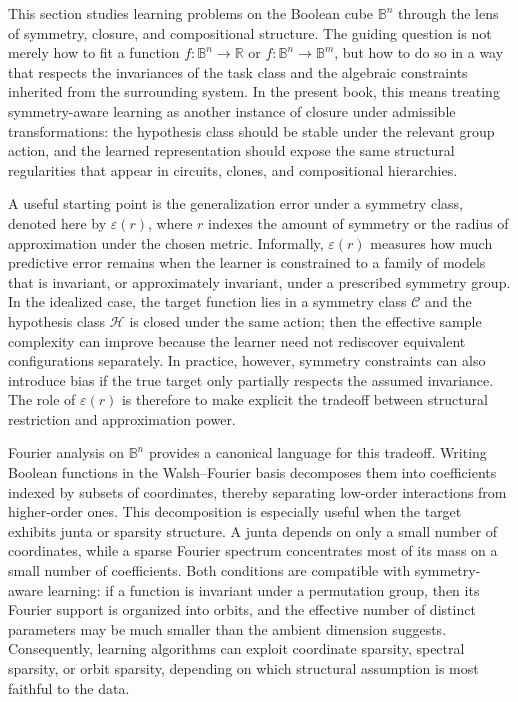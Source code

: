 This section studies learning problems on the Boolean cube \(\mathbb{B}^n\) through the lens of symmetry, closure, and compositional structure. The guiding question is not merely how to fit a function \(f : \mathbb{B}^n \to \mathbb{R}\) or \(f : \mathbb{B}^n \to \mathbb{B}^m\), but how to do so in a way that respects the invariances of the task class and the algebraic constraints inherited from the surrounding system. In the present book, this means treating symmetry-aware learning as another instance of closure under admissible transformations: the hypothesis class should be stable under the relevant group action, and the learned representation should expose the same structural regularities that appear in circuits, clones, and compositional hierarchies.

A useful starting point is the generalization error under a symmetry class, denoted here by \(\varepsilon(r)\), where \(r\) indexes the amount of symmetry or the radius of approximation under the chosen metric. Informally, \(\varepsilon(r)\) measures how much predictive error remains when the learner is constrained to a family of models that is invariant, or approximately invariant, under a prescribed symmetry group. In the idealized case, the target function lies in a symmetry class \(\mathcal{C}\) and the hypothesis class \(\mathcal{H}\) is closed under the same action; then the effective sample complexity can improve because the learner need not rediscover equivalent configurations separately. In practice, however, symmetry constraints can also introduce bias if the true target only partially respects the assumed invariance. The role of \(\varepsilon(r)\) is therefore to make explicit the tradeoff between structural restriction and approximation power.

Fourier analysis on \(\mathbb{B}^n\) provides a canonical language for this tradeoff. Writing Boolean functions in the Walsh--Fourier basis decomposes them into coefficients indexed by subsets of coordinates, thereby separating low-order interactions from higher-order ones. This decomposition is especially useful when the target exhibits junta or sparsity structure. A junta depends on only a small number of coordinates, while a sparse Fourier spectrum concentrates most of its mass on a small number of coefficients. Both conditions are compatible with symmetry-aware learning: if a function is invariant under a permutation group, then its Fourier support is organized into orbits, and the effective number of distinct parameters may be much smaller than the ambient dimension suggests. Consequently, learning algorithms can exploit coordinate sparsity, spectral sparsity, or orbit sparsity, depending on which structural assumption is most faithful to the data.

